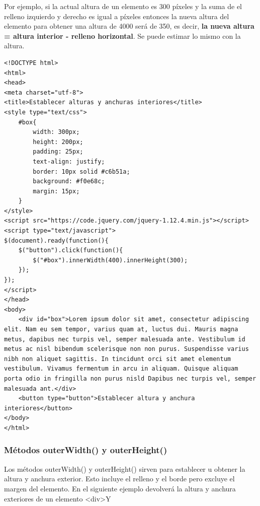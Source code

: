 \documentclass[11pt]{article}
\begin{document}
Por ejemplo, si la actual altura de un elemento es 300 píxeles y la suma de el relleno izquierdo y derecho es igual a píxeles entonces la nueva altura del elemento para obtener una altura de 4000 será de 350, es decir, \textbf{la nueva altura = altura interior - relleno horizontal}. Se puede estimar lo mismo con la altura.

\begin{verbatim}
<!DOCTYPE html>
<html>
<head>
<meta charset="utf-8">
<title>Establecer alturas y anchuras interiores</title>
<style type="text/css">
    #box{
        width: 300px;
        height: 200px;
        padding: 25px;
        text-align: justify;
        border: 10px solid #c6b51a;
        background: #f0e68c;
        margin: 15px;
    }        
</style>
<script src="https://code.jquery.com/jquery-1.12.4.min.js"></script>
<script type="text/javascript">
$(document).ready(function(){
    $("button").click(function(){
        $("#box").innerWidth(400).innerHeight(300);
    });
});
</script>
</head>
<body>
    <div id="box">Lorem ipsum dolor sit amet, consectetur adipiscing elit. Nam eu sem tempor, varius quam at, luctus dui. Mauris magna metus, dapibus nec turpis vel, semper malesuada ante. Vestibulum id metus ac nisl bibendum scelerisque non non purus. Suspendisse varius nibh non aliquet sagittis. In tincidunt orci sit amet elementum vestibulum. Vivamus fermentum in arcu in aliquam. Quisque aliquam porta odio in fringilla non purus nisld Dapibus nec turpis vel, semper malesuada ant.</div>
    <button type="button">Establecer altura y anchura interiores</button>
</body>
</html>                                		

\end{verbatim}

\subsubsection*{Métodos outerWidth() y outerHeight()}
\label{sec:orga82500e}

Los métodos outerWidth() y outerHeight() sirven para establecer u obtener la altura y anchura exterior. Esto incluye el relleno y el borde pero excluye el margen del elemento. En el siguiente ejemplo devolverá la altura y anchura exteriores de un elemento <div>Y
\end{document}
